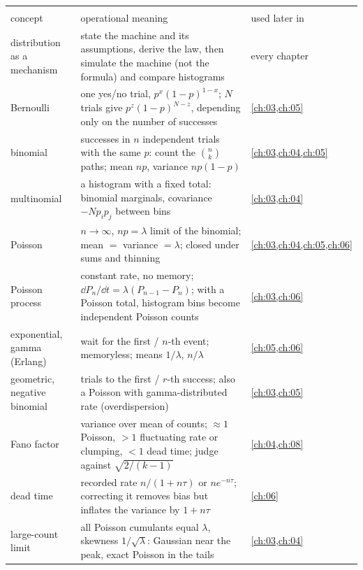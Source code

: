 \begin{center}
\small
\renewcommand{\arraystretch}{1.15}
\begin{tabularx}{\linewidth}{@{}>{\raggedright\arraybackslash}p{3.3cm}
                               >{\raggedright\arraybackslash}X
                               >{\raggedright\arraybackslash}p{2.7cm}@{}}
\toprule
\multicolumn{3}{@{}l}{\textbf{Counting distributions (first part)}}\\
concept & operational meaning & used later in\\\midrule
distribution as a mechanism & state the machine and its assumptions, derive the law, then simulate the machine (not the formula) and compare histograms & every chapter\\
Bernoulli & one yes/no trial, $p^x(1-p)^{1-x}$; $N$ trials give $p^z(1-p)^{N-z}$, depending only on the number of successes & \cref{ch:03,ch:05}\\
binomial & successes in $n$ independent trials with the same $p$: count the $\binom nk$ paths; mean $np$, variance $np(1-p)$ & \cref{ch:03,ch:04,ch:05}\\
multinomial & a histogram with a fixed total: binomial marginals, covariance $-Np_ip_j$ between bins & \cref{ch:03,ch:04}\\
Poisson & $n\to\infty$, $np=\lambda$ limit of the binomial; mean $=$ variance $=\lambda$; closed under sums and thinning & \cref{ch:03,ch:04,ch:05,ch:06}\\
Poisson process & constant rate, no memory; $\dd P_n/\dd t=\lambda(P_{n-1}-P_n)$; with a Poisson total, histogram bins become independent Poisson counts & \cref{ch:03,ch:06}\\
exponential, gamma (Erlang) & wait for the first / $n$-th event; memoryless; means $1/\lambda$, $n/\lambda$ & \cref{ch:05,ch:06}\\
geometric, negative binomial & trials to the first / $r$-th success; also a Poisson with gamma-distributed rate (overdispersion) & \cref{ch:03,ch:05}\\
Fano factor & variance over mean of counts; $\approx1$ Poisson, $>1$ fluctuating rate or clumping, $<1$ dead time; judge against $\sqrt{2/(k-1)}$ & \cref{ch:04,ch:08}\\
dead time & recorded rate $n/(1+n\tau)$ or $ne^{-n\tau}$; correcting it removes bias but inflates the variance by $1+n\tau$ & \cref{ch:06}\\
large-count limit & all Poisson cumulants equal $\lambda$, skewness $1/\sqrt\lambda$: Gaussian near the peak, exact Poisson in the tails & \cref{ch:03,ch:04}\\
\bottomrule
\end{tabularx}
\end{center}

